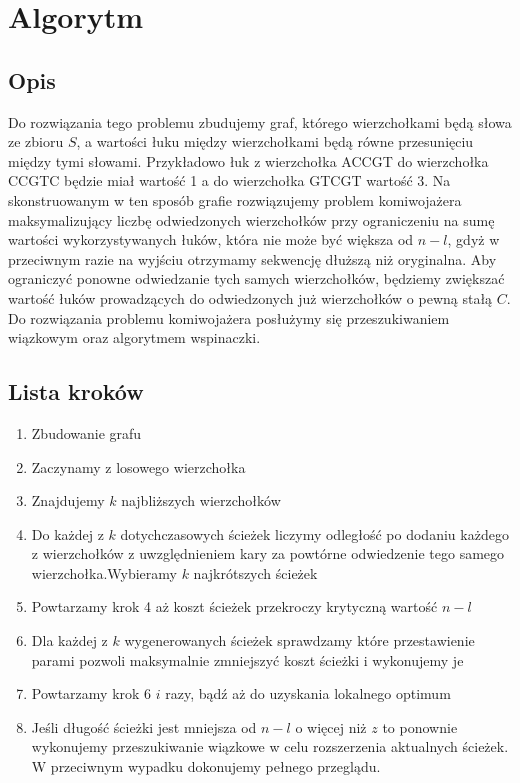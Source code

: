 \documentclass{article}
\begin{document}
\section{Algorytm}
\subsection{Opis}
Do rozwiązania tego problemu zbudujemy graf, którego wierzchołkami będą słowa ze zbioru $S$, a wartości łuku między wierzchołkami będą równe przesunięciu między tymi słowami. Przykładowo łuk z wierzchołka ACCGT do wierzchołka CCGTC będzie miał wartość 1 a do wierzchołka GTCGT wartość 3. Na skonstruowanym w ten sposób grafie rozwiązujemy problem komiwojażera maksymalizujący liczbę odwiedzonych wierzchołków przy ograniczeniu na sumę wartości wykorzystywanych łuków, która nie może być większa od $n - l$, gdyż w przeciwnym razie na wyjściu otrzymamy sekwencję dłuższą niż oryginalna.
Aby ograniczyć ponowne odwiedzanie tych samych wierzchołków, będziemy zwiększać wartość łuków prowadzących do odwiedzonych już wierzchołków o pewną stałą $C$.
Do rozwiązania problemu komiwojażera posłużymy się przeszukiwaniem wiązkowym oraz algorytmem wspinaczki.
\subsection{Lista kroków}
\begin{enumerate}
    \item Zbudowanie grafu
    \item Zaczynamy z losowego wierzchołka
    \item Znajdujemy $k$ najbliższych wierzchołków
    \item Do każdej z $k$ dotychczasowych ścieżek liczymy odległość po dodaniu każdego z wierzchołków z uwzględnieniem kary za powtórne odwiedzenie tego samego wierzchołka.Wybieramy $k$ najkrótszych ścieżek
    \item Powtarzamy krok 4 aż koszt ścieżek przekroczy krytyczną wartość $n-l$
    \item Dla każdej z $k$ wygenerowanych ścieżek sprawdzamy które przestawienie parami pozwoli maksymalnie zmniejszyć koszt ścieżki i wykonujemy je
    \item Powtarzamy krok 6 $i$ razy, bądź aż do uzyskania lokalnego optimum
    \item Jeśli długość ścieżki jest mniejsza od $n-l$ o więcej niż $z$ to ponownie wykonujemy przeszukiwanie wiązkowe w celu rozszerzenia aktualnych ścieżek. W przeciwnym wypadku dokonujemy pełnego przeglądu.
\end{enumerate}
\end{document}
